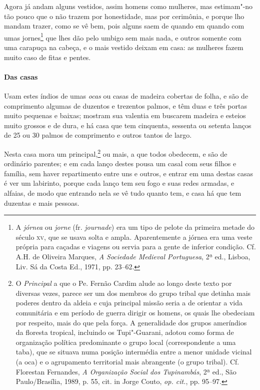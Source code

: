  Agora já andam alguns vestidos, assim homens como mulheres, mas
estimam"-no tão pouco que o não trazem por honestidade, mas por
cerimônia, e porque lho mandam trazer, como se vê bem, pois alguns
saem de quando em quando com umas jornes\footnote{ A \textit{jórnea} 
ou \textit{jorne} (fr. \textit{journade}) era um tipo
de pelote da primeira metade do século \textsc{xv}, que se usava solta e
ampla\textit{.} Aparentemente a jórnea era uma veste própria para
caçadas e viagens ou servia para a gente de inferior condição. Cf.
A.H. de Oliveira Marques, \textit{A Sociedade Medieval Portuguesa}, 2ª
ed., Lisboa, Liv. Sá da Costa Ed., 1971, pp. 23--62.} que lhes dão pelo
umbigo sem mais nada, e outros somente com uma carapuça na cabeça, e o
mais vestido deixam em casa: as mulheres fazem muito caso de fitas e pentes.

\paragraph{Das casas}

Usam estes índios de umas \textit{ocas} ou casas de madeira
cobertas de folha, e são de comprimento algumas de duzentos e trezentos
palmos, e têm duas e três portas muito pequenas e baixas; mostram sua
valentia em buscarem madeira e esteios muito grossos e de dura, e há
casa que tem cinquenta, sessenta ou setenta lanços de 25 ou 30 palmos
de comprimento e outros tantos de largo.
 
 Nesta casa mora um principal,\footnote{ O \textit{Principal} a que o
Pe. Fernão Cardim alude ao longo deste texto por diversas vezes, parece
ser um dos membros do grupo tribal que detinha mais poderes dentro da
aldeia e cuja principal missão seria a de orientar a vida comunitária e
em período de guerra dirigir os homens, os quais lhe obedeciam por
respeito, mais do que pela força. A generalidade dos grupos ameríndios
da floresta tropical, incluindo os Tupi"-Guarani, adotou como forma de
organização política predominante o grupo local (correspondente a uma
taba), que se situava numa posição intermédia entre a menor unidade
vicinal (a oca) e o agrupamento territorial mais abrangente (o grupo
tribal). Cf. Florestan Fernandes, \textit{A Organização Social dos
Tupinambás}, 2ª ed., São Paulo/Brasília, 1989, p. 55, cit. in Jorge
Couto, \textit{op. cit.}, pp. 95--97.} ou mais, a que todos obedecem, e
são de ordinário parentes; e em cada lanço destes pousa um casal com
seus filhos e família, sem haver repartimento entre uns e outros, e
entrar em uma destas casas é ver um labirinto, porque cada lanço tem
seu fogo e suas redes armadas, e alfaias, de modo que entrando nela se
vê tudo quanto tem, e casa há que tem duzentas e mais pessoas.

